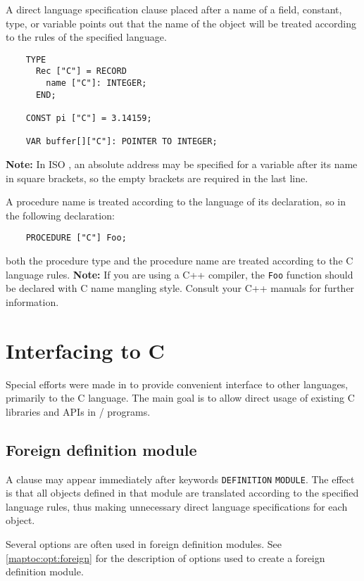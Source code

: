 A direct language specification clause placed after a name of a field,
constant, type, or variable points out that the name of the object
will be treated according to the rules of the specified
language.
\begin{verbatim}
    TYPE
      Rec ["C"] = RECORD
        name ["C"]: INTEGER;
      END;

    CONST pi ["C"] = 3.14159;

    VAR buffer[]["C"]: POINTER TO INTEGER;
\end{verbatim}
{\bf Note:} In ISO \mt{}, an absolute address may be specified
for a variable after its name in square brackets, so
the empty brackets are required in the last line.

A procedure name is treated according to the language of
its declaration, so in the following declaration:

\verb'    PROCEDURE ["C"] Foo;'

both the procedure type and the procedure name are treated
according to the C language rules.
{\bf Note:} If you are using a C++ compiler, the {\tt Foo}
function should be declared with C name mangling style.
Consult your C++ manuals for further information.


\section{Interfacing to C}\label{multilang:C}

Special efforts were made in \XDS{} to provide convenient
interface to other languages, primarily to the C language.
The main goal is to allow direct usage of existing C libraries and
APIs in \mt{}/\ot{} programs.

\subsection{Foreign definition module}

A 
clause may appear immediately after keywords \verb'DEFINITION'
\verb'MODULE'. The effect is that all objects defined in
that module are translated according to the specified
language rules, thus making unnecessary direct language
specifications for each object.

Several options are often used in foreign definition modules.
\ifgenc
See \ref{maptoc:opt:foreign} for the
description of options used to create a foreign definition module.
\fi

